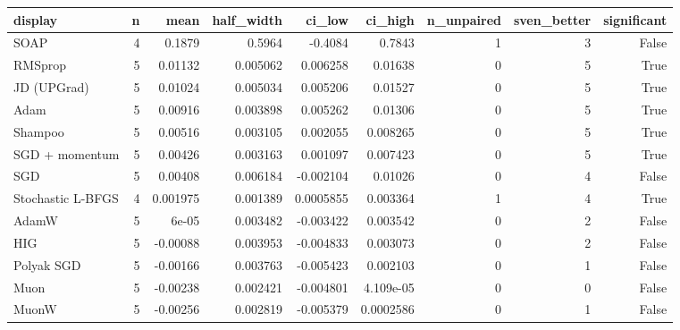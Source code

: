\begin{tabular}{lrrrrrrrr}
\toprule
display & n & mean & half\_width & ci\_low & ci\_high & n\_unpaired & sven\_better & significant \\
\midrule
SOAP & 4 & 0.1879 & 0.5964 & -0.4084 & 0.7843 & 1 & 3 & False \\
RMSprop & 5 & 0.01132 & 0.005062 & 0.006258 & 0.01638 & 0 & 5 & True \\
JD (UPGrad) & 5 & 0.01024 & 0.005034 & 0.005206 & 0.01527 & 0 & 5 & True \\
Adam & 5 & 0.00916 & 0.003898 & 0.005262 & 0.01306 & 0 & 5 & True \\
Shampoo & 5 & 0.00516 & 0.003105 & 0.002055 & 0.008265 & 0 & 5 & True \\
SGD + momentum & 5 & 0.00426 & 0.003163 & 0.001097 & 0.007423 & 0 & 5 & True \\
SGD & 5 & 0.00408 & 0.006184 & -0.002104 & 0.01026 & 0 & 4 & False \\
Stochastic L-BFGS & 4 & 0.001975 & 0.001389 & 0.0005855 & 0.003364 & 1 & 4 & True \\
AdamW & 5 & 6e-05 & 0.003482 & -0.003422 & 0.003542 & 0 & 2 & False \\
HIG & 5 & -0.00088 & 0.003953 & -0.004833 & 0.003073 & 0 & 2 & False \\
Polyak SGD & 5 & -0.00166 & 0.003763 & -0.005423 & 0.002103 & 0 & 1 & False \\
Muon & 5 & -0.00238 & 0.002421 & -0.004801 & 4.109e-05 & 0 & 0 & False \\
MuonW & 5 & -0.00256 & 0.002819 & -0.005379 & 0.0002586 & 0 & 1 & False \\
\bottomrule
\end{tabular}

